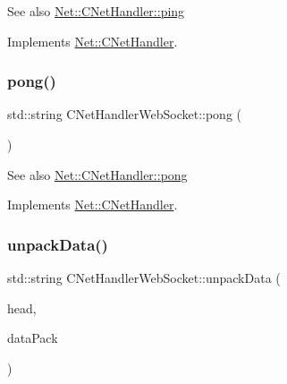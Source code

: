 \begin{DoxySeeAlso}{See also}
\mbox{\hyperlink{class_net_1_1_c_net_handler_af905edf8c2f5dee54f278f78d66b400d}{Net\+::\+C\+Net\+Handler\+::ping}} 
\end{DoxySeeAlso}


Implements \mbox{\hyperlink{class_net_1_1_c_net_handler_af905edf8c2f5dee54f278f78d66b400d}{Net\+::\+C\+Net\+Handler}}.

\mbox{\label{class_net_1_1_c_net_handler_web_socket_a51d3618ba601abc5047cf0da91b8a374}} 
\subsubsection{\texorpdfstring{pong()}{pong()}}
{\footnotesize\ttfamily std\+::string C\+Net\+Handler\+Web\+Socket\+::pong (\begin{DoxyParamCaption}{ }\end{DoxyParamCaption})\hspace{0.3cm}{\ttfamily [virtual]}}

\begin{DoxySeeAlso}{See also}
\mbox{\hyperlink{class_net_1_1_c_net_handler_a818189d3332d68cf28d30ec31bed0e17}{Net\+::\+C\+Net\+Handler\+::pong}} 
\end{DoxySeeAlso}


Implements \mbox{\hyperlink{class_net_1_1_c_net_handler_a818189d3332d68cf28d30ec31bed0e17}{Net\+::\+C\+Net\+Handler}}.

\mbox{\label{class_net_1_1_c_net_handler_web_socket_a09297039609dca2d8e2c376626ef78f1}} 
\subsubsection{\texorpdfstring{unpack\+Data()}{unpackData()}}
{\footnotesize\ttfamily std\+::string C\+Net\+Handler\+Web\+Socket\+::unpack\+Data (\begin{DoxyParamCaption}\item[{const \mbox{\hyperlink{struct_net_1_1_s_message_head}{S\+Message\+Head}} \&}]{head,  }\item[{const std\+::string \&}]{data\+Pack }\end{DoxyParamCaption})\hspace{0.3cm}{\ttfamily [virtual]}}

